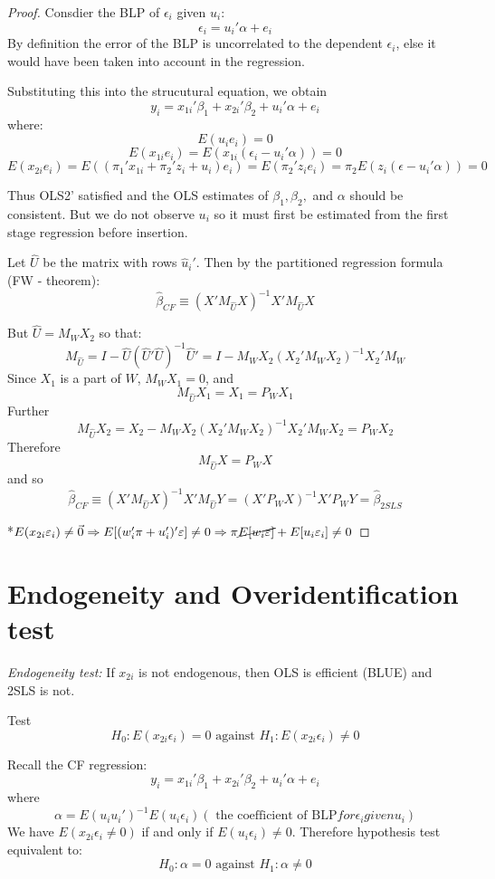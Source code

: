 \documentclass[DIV=14,titlepage=false]{scrreprt}
\begin{document}
\begin{proof}
Consdier the BLP of \(\epsilon_i\) given \(u_i\):
\[\epsilon_i=u_i'\alpha+e_i\]
By definition the error of the BLP is uncorrelated to the dependent \(\epsilon_i\), else it would have been taken into account in the regression.

Substituting this into the strucutural equation, we obtain\[y_i=x_{1i}'\beta_1+x_{2i}'\beta_2+u_i'\alpha+e_i\]
where:
\[E(u_ie_i)=0\]
\[E(x_{1i}e_i)=E(x_{1i}(\epsilon_i-u_i'\alpha))=0\]
\[E(x_{2i}e_i)=E((\pi_1'x_{1i}+\pi_2'z_i+u_i)e_i)=E(\pi_2'z_ie_i)=\pi_2E(z_i(\epsilon-u_i'\alpha))=0\]

Thus OLS2' satisfied and the OLS estimates of \(\beta_1,\beta_2,\) and \(\alpha\) should be consistent. But we do not observe \(u_i\) so it must first be estimated from the first stage regression before insertion.

Let \(\hat U\) be the matrix with rows \(\hat u_i'\). Then by the partitioned regression formula (FW - theorem):
\[\hat\beta_{CF}\equiv(X'M_{\hat U}X)^{-1}X'M_{\hat U}X\]

But \(\hat U = M_WX_2\) so that:
\[M_{\hat U}=I-\hat U(\hat U'\hat U)^{-1}\hat U'= I-M_WX_2(X_2'M_WX_2)^{-1}X_2'M_W\]
Since \(X_1\) is a part of \(W\), \(M_WX_1=0\), and
\[M_{\hat U}X_1=X_1=P_WX_1\]
Further
\[M_{\hat U}X_2=X_2-M_WX_2(X_2'M_WX_2)^{-1}X_2'M_WX_2=P_WX_2\]
Therefore
\[M_{\hat U}X=P_WX\]
and so
\[\hat\beta_{CF}\equiv(X'M_{\hat U}X)^{-1}X'M_{\hat U}Y=(X'P_WX)^{-1}X'P_WY=\hat\beta_{2SLS}\]

*\(E(x_{2i} \epsilon_i)\neq\vec0 \implies E[(w_i'\pi + u_i')'\epsilon]\neq0 \implies \pi \cancel{E[w_i\epsilon]} + E[u_i\epsilon_i]\neq0\)

\end{proof}

\section{Endogeneity and Overidentification test}

\textit{Endogeneity test:} If \(x_{2i}\) is not endogenous, then OLS is efficient (BLUE) and 2SLS is not.

Test \[H_0: E(x_{2i}\epsilon_i)=0\text{ against }H_1: E(x_{2i}\epsilon_i)\neq0\]

Recall the CF regression:
\[y_i=x_{1i}'\beta_1+x_{2i}'\beta_2+u_i'\alpha+e_i\]
where \[ \alpha = E(u_iu_i')^{-1}E(u_i\epsilon_i) (\text{ the coefficient of BLP} for \epsilon_i given u_i)\]
We have \(E(x_{2i}\epsilon_i\neq0)\) if and only if \(E(u_i\epsilon_i)\neq0\). Therefore hypothesis test equivalent to:
\[H_0: \alpha=0 \text{ against }H_1: \alpha\neq0\]
\end{document}
